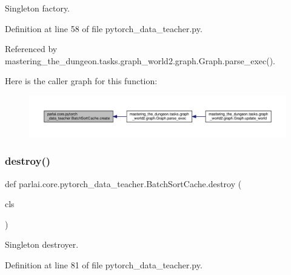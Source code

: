 \begin{DoxyVerb}Singleton factory.\end{DoxyVerb}
 

Definition at line 58 of file pytorch\+\_\+data\+\_\+teacher.\+py.



Referenced by mastering\+\_\+the\+\_\+dungeon.\+tasks.\+graph\+\_\+world2.\+graph.\+Graph.\+parse\+\_\+exec().

Here is the caller graph for this function\+:
\nopagebreak
\begin{figure}[H]
\begin{center}
\leavevmode
\includegraphics[width=350pt]{classparlai_1_1core_1_1pytorch__data__teacher_1_1BatchSortCache_a272dbfe6529aa39066b4ad8504f40f5d_icgraph}
\end{center}
\end{figure}
\mbox{\label{classparlai_1_1core_1_1pytorch__data__teacher_1_1BatchSortCache_a115f5df4f4fafa087f592e9a0ab48d9c}} 
\subsubsection{\texorpdfstring{destroy()}{destroy()}}
{\footnotesize\ttfamily def parlai.\+core.\+pytorch\+\_\+data\+\_\+teacher.\+Batch\+Sort\+Cache.\+destroy (\begin{DoxyParamCaption}\item[{}]{cls }\end{DoxyParamCaption})}

\begin{DoxyVerb}Singleton destroyer.\end{DoxyVerb}
 

Definition at line 81 of file pytorch\+\_\+data\+\_\+teacher.\+py.



